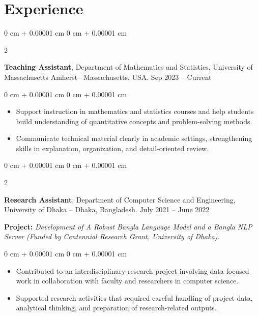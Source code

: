 \documentclass[10pt, letterpaper]{article}
\newenvironment{highlights}{
    \begin{itemize}[
        topsep=0.10 cm,
        parsep=0.10 cm,
        partopsep=0pt,
        itemsep=0pt,
        leftmargin=0 cm + 10pt
    ]
}{
    \end{itemize}
} %
\newenvironment{onecolentry}{
    \begin{adjustwidth}{
        0 cm + 0.00001 cm
    }{
        0 cm + 0.00001 cm
    }
}{
    \end{adjustwidth}
} %
\newenvironment{twocolentry}[2][]{
    \onecolentry
    \def\secondColumn{#2}
    \setcolumnwidth{\fill, 4.5 cm}
    \begin{paracol}{2}
}{
    \switchcolumn \raggedleft \secondColumn
    \end{paracol}
    \endonecolentry
} %
\begin{document}
    \section{Experience}
    
    \begin{twocolentry}{
            Sep 2023 – Current
        }
            \textbf{Teaching Assistant}, Department of Mathematics and Statistics, University of Massachusetts Amherst-- Massachusetts, USA.\end{twocolentry}
    \begin{onecolentry}
        \begin{highlights}
            \item Support instruction in mathematics and statistics courses and help students build understanding of quantitative concepts and problem-solving methods.
            \item Communicate technical material clearly in academic settings, strengthening skills in explanation, organization, and detail-oriented review.
        \end{highlights}
    \end{onecolentry}

   \begin{twocolentry}{
            July 2021 -- June 2022
        }
            \textbf{Research Assistant}, Department of Computer Science and Engineering, University of Dhaka -- Dhaka, Bangladesh.\end{twocolentry} 

    \textbf{Project: }\textit{Development of A Robust Bangla Language Model and a Bangla NLP Server (Funded by Centennial Research Grant, University of Dhaka).}\\
    \begin{onecolentry}
        \begin{highlights}
            \item Contributed to an interdisciplinary research project involving data-focused work in collaboration with faculty and researchers in computer science.
            \item Supported research activities that required careful handling of project data, analytical thinking, and preparation of research-related outputs.
        \end{highlights}
    \end{onecolentry}
\end{document}
